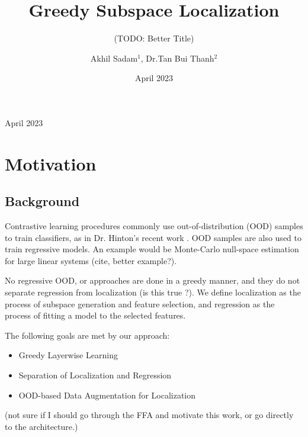 \usepackage{pdfpages}

\date{April 2023}
\title{Greedy Subspace Localization}
\subtitle{(TODO: Better Title)}
\author{Akhil Sadam$^1$, Dr.Tan Bui Thanh$^2$}
\address{$^1$Department of Aerospace Engineering and Engineering Mechanics, UT Austin\\$^2$The Oden Institute for Computational Sciences, UT Austin}
\begin{indented}
\item[]April 2023
\end{indented}
\section{Motivation}
\subsection{Background}
Contrastive learning procedures commonly use out-of-distribution (OOD) samples to train classifiers, as in Dr. Hinton's recent work \cite{FFA23}.
OOD samples are also used to train regressive models. An example would be Monte-Carlo null-space estimation for large linear systems (cite, better example?).

No regressive OOD, or  approaches are done in a greedy manner, and they do not separate regression from localization (is this true ?).
We define localization as the process of subspace generation and feature selection, and regression as the process of fitting a model to the selected features.

The following goals are met by our approach:
\begin{itemize}
\item Greedy Layerwise Learning 
\item Separation of Localization and Regression
\item OOD-based Data Augmentation for Localization
\end{itemize}

(not sure if I should go through the FFA and motivate this work, or go directly to the architecture.)
